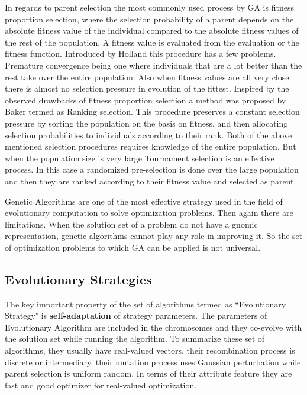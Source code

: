 In regards to parent selection the most commonly used process by GA is fitness proportion selection, where the selection probability of a parent depends on the absolute fitness value of the individual compared to the absolute fitness values of the rest of the population. A fitness value is evaluated from the evaluation or the fitness function. Introduced by Holland \cite{holland1975} this procedure has a few problems. Premature convergence being one where individuals that are a lot better than the rest take over the entire population. Also when fitness values are all very close there is almost no selection pressure in evolution of the fittest. Inspired by the observed drawbacks of fitness proportion selection a method was proposed by Baker \cite{baker1987} termed as Ranking selection. This procedure preserves a constant selection pressure by sorting the population on the basis on fitness, and then allocating selection probabilities to individuals according to their rank. Both of the above mentioned selection procedures requires knowledge of the entire population. But when the population size is very large Tournament selection is an effective process. In this case a randomized pre-selection is done over the large population and then they are ranked according to their fitness value and selected as parent. 

Genetic Algorithms are one of the most effective strategy used in the field of evolutionary computation to solve optimization problems. Then again there are limitations. When the solution set of a problem do not have a gnomic representation, genetic algorithms cannot play any role in improving it. So the set of optimization problems to which GA can be applied is not universal.

\subsection{Evolutionary Strategies}
The key important property of the set of algorithms termed as ``Evolutionary Strategy" is \textbf{self-adaptation} of strategy parameters. The  parameters of Evolutionary Algorithm are included in the chromosomes and they co-evolve with the solution set while running the algorithm. To summarize these set of algorithms, they usually have real-valued vectors, their recombination process is discrete or intermediary, their mutation process uses Gaussian perturbation while parent selection is uniform random. In terms of their attribute feature they are fast and good optimizer for real-valued optimization.

